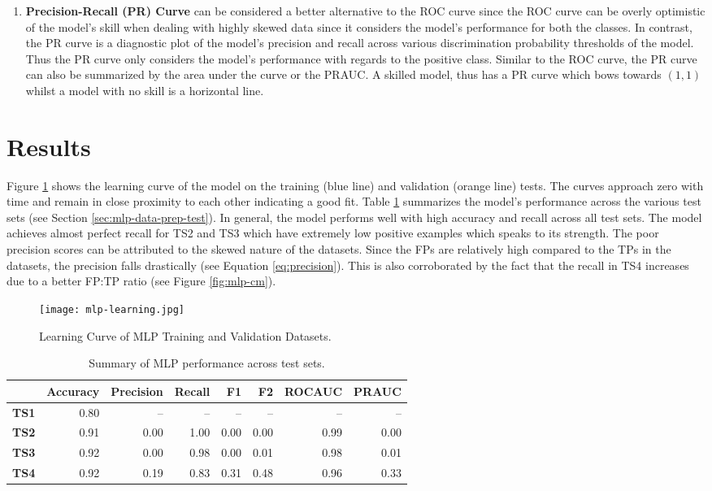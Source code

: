 \begin{enumerate}
\item \textbf{Precision-Recall (PR) Curve} can be considered a better
  alternative to the ROC curve since the ROC curve can be overly
  optimistic of the model's skill when dealing with highly skewed data
  since it considers the model's performance for both the classes. In
  contrast, the PR curve is a diagnostic plot of the model's precision
  and recall across various discrimination probability thresholds of
  the model. Thus the PR curve only considers the model's performance
  with regards to the positive class. Similar to the ROC curve, the PR
  curve can also be summarized by the area under the curve or the
  PRAUC. A skilled model, thus has a PR curve which bows towards
  $(1,1)$ whilst a model with no skill is a horizontal line.
\end{enumerate}

\section{Results}
\label{sec:mlp-disc}

Figure \ref{fig:mlp-learning} shows the learning curve of the model on
the training (blue line) and validation (orange line) tests. The
curves approach zero with time and remain in close proximity to each
other indicating a good fit. Table \ref{tab:mlp-results} summarizes
the model's performance across the various test sets (see Section
\ref{sec:mlp-data-prep-test}). In general, the model performs well
with high accuracy and recall across all test sets. The model achieves
almost perfect recall for TS2 and TS3 which have extremely low
positive examples which speaks to its strength. The poor precision
scores can be attributed to the skewed nature of the datasets. Since
the FPs are relatively high compared to the TPs in the datasets, the
precision falls drastically (see Equation \ref{eq:precision}). This is
also corroborated by the fact that the recall in TS4 increases due to
a better FP:TP ratio (see Figure \ref{fig:mlp-cm}).

\begin{figure}[htb]
  \centering
  \texttt{[image: mlp-learning.jpg]}
  \caption{Learning Curve of MLP Training and Validation Datasets.}
  \label{fig:mlp-learning}
\end{figure}

\begin{table}[htb]
  \centering
  \caption{Summary of MLP performance across test sets.}
    \begin{tabular}{rrrrrrrr}
      \hline
      & Accuracy & Precision & Recall & F1 & F2 & ROCAUC & PRAUC \\
      \hline
      \textbf{TS1} & 0.80 & -- & -- & -- & -- & -- & -- \\
      \textbf{TS2} & 0.91 & 0.00 & 1.00 & 0.00 & 0.00 & 0.99 & 0.00 \\
      \textbf{TS3} & 0.92 & 0.00 & 0.98 & 0.00 & 0.01 & 0.98 & 0.01 \\
      \textbf{TS4} & 0.92 & 0.19 & 0.83 & 0.31 & 0.48 & 0.96 & 0.33 \\
      \hline
    \end{tabular}
    \label{tab:mlp-results}
\end{table}

